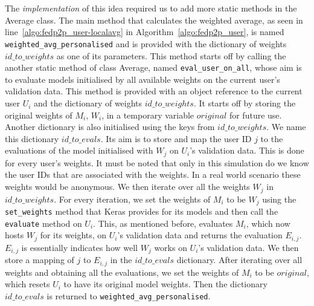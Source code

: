 \documentclass[12pt]{article}
\begin{document}
\\\\
The \textit{implementation} of this idea required us to add more static methods in the Average class. The main method that calculates the weighted average, as seen in line~\ref{algo:fedp2p_user-localavg} in Algorithm~\ref{algo:fedp2p_user}, is named \texttt{weighted\_avg\_personalised} and is provided with the dictionary of weights $id\_to\_weights$ as one of its parameters. This method starts off by calling the another static method of class Average, named \texttt{eval\_user\_on\_all}, whose aim is to evaluate models initialised by all available weights on the current user's validation data. This method is provided with an object reference to the current user $U_i$ and the dictionary of weights $id\_to\_weights$. It starts off by storing the original weights of $M_i$, $W_i$, in a temporary  variable $original$ for future use. Another dictionary is also initialised using the keys from $id\_to\_weights$. We name this dictionary $id\_to\_evals$. Its aim is to store and map the user ID $j$ to the evaluations of the model initialised with $W_j$ on $U_i$'s validation data. This is done for every user's weights. It must be noted that only in this simulation do we know the user IDs that are associated with the weights. In a real world scenario these weights would be anonymous. We then iterate over all the weights $W_j$ in $id\_to\_weights$. For every iteration, we set the weights of $M_i$ to be $W_j$ using the \texttt{set\_weights} method that Keras provides for its models and then call the \texttt{evaluate} method on $U_i$. This, as mentioned before, evaluates $M_i$, which now hosts $W_j$ for its weights, on $U_i$'s validation data and returns the evaluation $E_{i,j}$. $E_{i,j}$ is essentially indicates how well $W_j$ works on $U_i$'s validation data. We then store a mapping of $j$ to $E_{i,j}$ in the $id\_to\_evals$ dictionary. After iterating over all weights and obtaining all the evaluations, we set the weights of $M_i$ to be $original$, which resets $U_i$ to have its original model weights. Then the dictionary $id\_to\_evals$ is returned to \texttt{weighted\_avg\_personalised}.
\\\\
\end{document}
